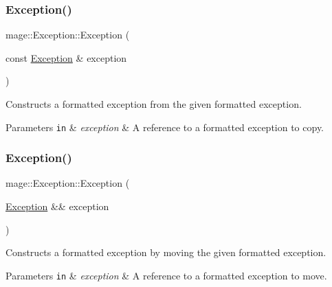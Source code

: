 \subsubsection{\texorpdfstring{Exception()}{Exception()}\hspace{0.1cm}{\footnotesize\ttfamily [4/5]}}
{\footnotesize\ttfamily mage\+::\+Exception\+::\+Exception (\begin{DoxyParamCaption}\item[{const \mbox{\hyperlink{classmage_1_1_exception}{Exception}} \&}]{exception }\end{DoxyParamCaption})\hspace{0.3cm}{\ttfamily [default]}}

Constructs a formatted exception from the given formatted exception.


\begin{DoxyParams}[1]{Parameters}
\mbox{\tt in}  & {\em exception} & A reference to a formatted exception to copy. \\
\hline
\end{DoxyParams}
\mbox{\label{classmage_1_1_exception_a5a745eb8921cb986c822c0f95455314a}} 
\subsubsection{\texorpdfstring{Exception()}{Exception()}\hspace{0.1cm}{\footnotesize\ttfamily [5/5]}}
{\footnotesize\ttfamily mage\+::\+Exception\+::\+Exception (\begin{DoxyParamCaption}\item[{\mbox{\hyperlink{classmage_1_1_exception}{Exception}} \&\&}]{exception }\end{DoxyParamCaption})\hspace{0.3cm}{\ttfamily [default]}}

Constructs a formatted exception by moving the given formatted exception.


\begin{DoxyParams}[1]{Parameters}
\mbox{\tt in}  & {\em exception} & A reference to a formatted exception to move. \\
\hline
\end{DoxyParams}
\mbox{\label{classmage_1_1_exception_a088e91ba8dffd31a9d6aa7d4af2ee2c0}} 
